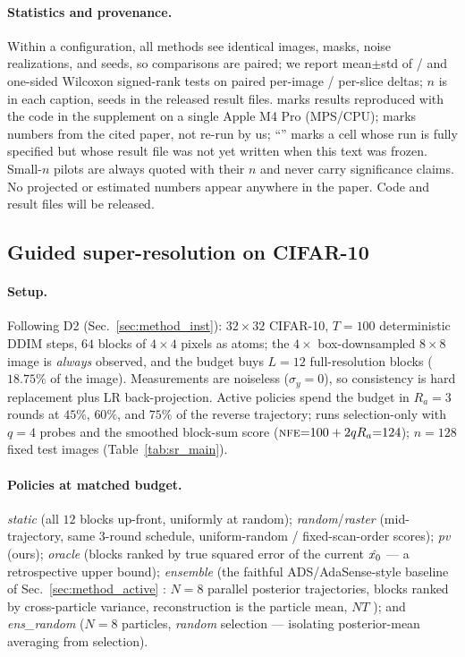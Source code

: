 \paragraph{Statistics and provenance.} Within a configuration, all
methods see identical images, masks, noise realizations, and seeds, so
comparisons are paired; we report mean$\pm$std of \psnrm{}/\ssimm{}
\cite{wang2004ssim} and one-sided Wilcoxon signed-rank tests on paired
per-image / per-slice \psnrm{} deltas; $n$ is in each caption, seeds in
the released result files. \RLOCAL{} marks results reproduced with the
code in the supplement on a single Apple M4 Pro (MPS/CPU); \CITED{}
marks numbers from the cited paper, not re-run by us; ``\PENDING''
marks a cell whose run is fully specified but whose result file was not
yet written when this text was frozen. Small-$n$ pilots are always
quoted with their $n$ and never carry significance claims. No projected
or estimated numbers appear anywhere in the paper. Code and result
files will be released.

\subsection{Guided super-resolution on CIFAR-10}\label{sec:exp_sr}

\paragraph{Setup.} Following D2 (Sec.~\ref{sec:method_inst}):
$32{\times}32$ CIFAR-10, $T{=}100$ deterministic DDIM steps, $64$
blocks of $4{\times}4$ pixels as atoms; the $4{\times}$ box-downsampled
$8{\times}8$ image is \emph{always} observed, and the budget buys
$L{=}12$ full-resolution blocks ($18.75\%$ of the image). Measurements
are noiseless ($\sigma_y{=}0$), so consistency is hard replacement plus
LR back-projection. Active policies spend the
budget in $R_a{=}3$ rounds at $45\%$, $60\%$, and $75\%$ of the reverse
trajectory; \pvas{} runs selection-only with $q{=}4$ probes and the
smoothed block-sum score ($\textsc{nfe}{=}100+2qR_a{=}124$); $n{=}128$ fixed
test images (Table~\ref{tab:sr_main}).

\paragraph{Policies at matched budget.}
\emph{static} (all $12$ blocks up-front, uniformly at random);
\emph{random}/\emph{raster} (mid-trajectory, same 3-round schedule,
uniform-random / fixed-scan-order scores); \emph{pv} (ours);
\emph{oracle} (blocks ranked by true squared error of the current
$\hat{x_0}$ --- a retrospective upper bound); \emph{ensemble}
(the faithful ADS/AdaSense-style baseline of
Sec.~\ref{sec:method_active} \cite{nolan2025ads,elata2024adasense}:
$N{=}8$ parallel posterior trajectories, blocks ranked by
cross-particle variance, reconstruction is the particle mean, $NT$
\nfe); and \emph{ens\_random} ($N{=}8$ particles, \emph{random}
selection --- isolating posterior-mean averaging from selection).

